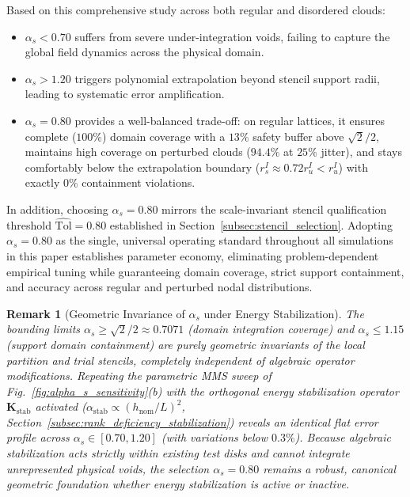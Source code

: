 \documentclass[preprint,12pt]{elsarticle}
\newtheorem{remark}{Remark}
\begin{document}
Based on this comprehensive study across both regular and disordered clouds:
\begin{itemize}
    \item $\alpha_s < 0.70$ suffers from severe under-integration voids, failing to capture the global field dynamics across the physical domain.
    \item $\alpha_s > 1.20$ triggers polynomial extrapolation beyond stencil support radii, leading to systematic error amplification.
    \item $\alpha_s = 0.80$ provides a well-balanced trade-off: on regular lattices, it ensures complete ($100\%$) domain coverage with a $13\%$ safety buffer above $\sqrt{2}/2$, maintains high coverage on perturbed clouds ($94.4\%$ at $25\%$ jitter), and stays comfortably below the extrapolation boundary ($r_s^I \approx 0.72 r_u^I < r_u^I$) with exactly $0\%$ containment violations.
\end{itemize}
In addition, choosing $\alpha_s = 0.80$ mirrors the scale-invariant stencil qualification threshold $\widehat{\mathrm{Tol}} = 0.80$ established in Section~\ref{subsec:stencil_selection}. Adopting $\alpha_s = 0.80$ as the single, universal operating standard throughout all simulations in this paper establishes parameter economy, eliminating problem-dependent empirical tuning while guaranteeing domain coverage, strict support containment, and accuracy across regular and perturbed nodal distributions.

\begin{remark}[Geometric Invariance of $\alpha_s$ under Energy Stabilization]
    The bounding limits $\alpha_s \ge \sqrt{2}/2 \approx 0.7071$ (domain integration coverage) and $\alpha_s \le 1.15$ (support domain containment) are purely geometric invariants of the local partition and trial stencils, completely independent of algebraic operator modifications. Repeating the parametric MMS sweep of Fig.~\ref{fig:alpha_s_sensitivity}(b) with the orthogonal energy stabilization operator $\mathbf{K}_{\mathrm{stab}}$ activated ($\alpha_{\mathrm{stab}} \propto (h_{\mathrm{nom}}/L)^2$, Section~\ref{subsec:rank_deficiency_stabilization}) reveals an identical flat error profile across $\alpha_s \in [0.70, 1.20]$ (with variations below $0.3\%$). Because algebraic stabilization acts strictly within existing test disks and cannot integrate unrepresented physical voids, the selection $\alpha_s = 0.80$ remains a robust, canonical geometric foundation whether energy stabilization is active or inactive.
\end{remark}
\end{document}

